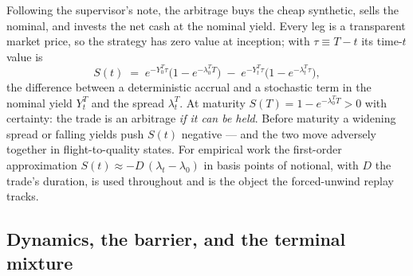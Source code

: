 \documentclass[11pt]{article}
\begin{document}
Following the supervisor's note, the arbitrage buys the cheap synthetic, sells the nominal, and invests the net cash at the nominal yield. Every leg is a transparent market price, so the strategy has zero value at inception; with $\tau\equiv T-t$ its time-$t$ value is
\begin{equation}
S(t) \;=\; e^{-Y_0^T\tau}\big(1-e^{-\lambda_0^T T}\big)\;-\;e^{-Y_t^T\tau}\big(1-e^{-\lambda_t^T\tau}\big),
\label{eq:mtm}
\end{equation}
the difference between a deterministic accrual and a stochastic term in the nominal yield $Y_t^T$ and the spread $\lambda_t^T$. At maturity $S(T)=1-e^{-\lambda_0^T T}>0$ with certainty: the trade is an arbitrage \emph{if it can be held}. Before maturity a widening spread or falling yields push $S(t)$ negative --- and the two move adversely together in flight-to-quality states. For empirical work the first-order approximation $S(t)\approx -D\,(\lambda_t-\lambda_0)$ in basis points of notional, with $D$ the trade's duration, is used throughout and is the object the forced-unwind replay tracks.

\subsection{Dynamics, the barrier, and the terminal mixture}
\end{document}
